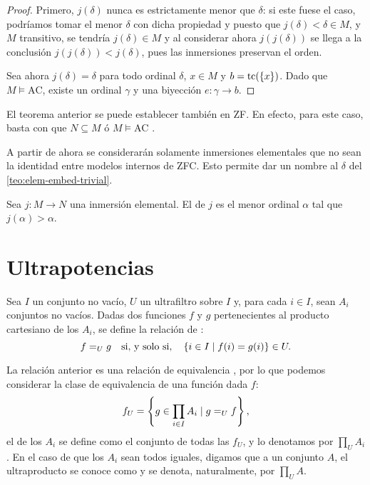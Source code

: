 \begin{proof}
    Primero, $j(\delta)$ nunca es estrictamente menor que $\delta$:
    si este fuese el caso, podríamos tomar el menor $\delta$ con dicha propiedad
    y puesto que $j(\delta) < \delta \in M$, y $M$ transitivo, se tendría
    $j(\delta)\in M$ y al considerar ahora $j(j(\delta))$ se llega a la conclusión
    $j(j(\delta)) < j(\delta)$, pues las inmersiones preservan el orden.
    
    Sea ahora $j(\delta) = \delta$ para todo ordinal $\delta$, $x\in M$ y $b = \operatorname{tc}(\left\{ x \right\})$.
    Dado que $M\models \text{AC}$, existe un ordinal $\gamma$ y
    una biyección $e\colon\gamma\to b$.

\end{proof}

El teorema anterior se puede establecer también en ZF.
En efecto, para este caso, basta con que $N\subseteq M$ ó $M\models \text{AC}$
.

A partir de ahora
se considerarán solamente inmersiones elementales que no sean la identidad
entre modelos internos de ZFC.
Esto permite dar un nombre al $\delta$ del \cref{teo:elem-embed-trivial}.

\begin{defi}
    Sea $j\colon M\to N$ una inmersión elemental. El  de $j$
    es el menor ordinal $\alpha$ tal que $j(\alpha)>\alpha$.
\end{defi}

\section{Ultrapotencias}
Sea $I$ un conjunto no vacío, $U$ un ultrafiltro sobre $I$ y, para cada $i\in I$,
sean $A_i$ conjuntos no vacíos. Dadas dos funciones $f$ y $g$ pertenecientes al producto
cartesiano de los $A_i$, se define la relación de :
\[
    f=_U g \quad\text{si, y solo si,}\quad \left\{ i\in I\mid f(i)=g(i) \right\}\in U.
\]

La relación anterior es una relación de equivalencia \autocite[Proposición 4.1.5]{chang_model_2012},
por lo que podemos considerar la clase de equivalencia de una función dada $f$:
\[
    f_U = \left\{ g\in \prod_{i\in I} A_i\mid g=_U f \right\},
\]
el  de los $A_i$ se define como el conjunto de todas las $f_U$,
y lo denotamos por $\prod_U A_i$. En el caso de que los $A_i$ sean todos iguales, digamos que
a un conjunto $A$, el ultraproducto se conoce como  y se denota, naturalmente,
por $\prod_U A$.

